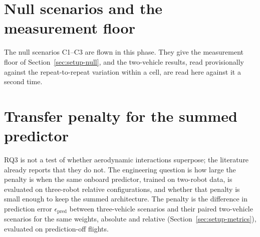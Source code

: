 
\section{Null scenarios and the measurement floor}
\label{sec:res3-null}
The null scenarios C1--C3 are flown in this phase. They give the measurement floor of
Section~\ref{sec:setup-null}, and the two-vehicle results, read provisionally against the
repeat-to-repeat variation within a cell, are read here against it a second time.


\section{Transfer penalty for the summed predictor}
\label{sec:res3-transfer}

RQ3 is not a test of whether aerodynamic interactions superpose; the literature already reports that
they do not. The engineering question is how large the penalty is when the same onboard predictor,
trained on two-robot data, is evaluated on three-robot relative configurations, and whether that
penalty is small enough to keep the summed architecture. The penalty is the difference in
prediction error $\epsilon_{\mathrm{pred}}$ between three-vehicle scenarios and their paired
two-vehicle scenarios for the same weights, absolute and relative
(Section~\ref{sec:setup-metrics}), evaluated on prediction-off flights.


